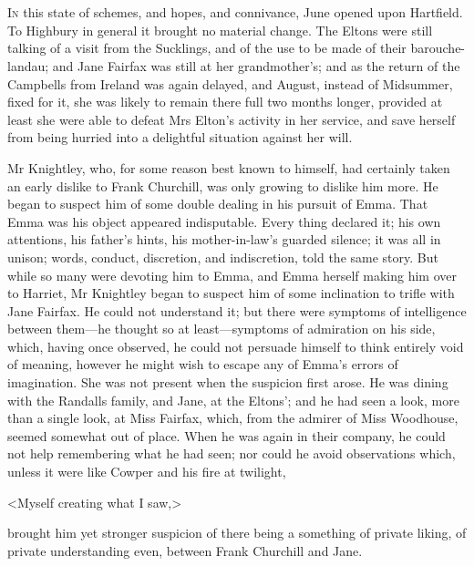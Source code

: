 \chapter[Chapter \thechapter]{}
\lettrine[lraise=0.3]{I}{n} this state of schemes, and hopes, and connivance, June opened upon Hartfield. To Highbury in general it brought no material change. The Eltons were still talking of a visit from the Sucklings, and of the use to be made of their barouche-landau; and Jane Fairfax was still at her grandmother's; and as the return of the Campbells from Ireland was again delayed, and August, instead of Midsummer, fixed for it, she was likely to remain there full two months longer, provided at least she were able to defeat Mrs Elton's activity in her service, and save herself from being hurried into a delightful situation against her will.

Mr Knightley, who, for some reason best known to himself, had certainly taken an early dislike to Frank Churchill, was only growing to dislike him more. He began to suspect him of some double dealing in his pursuit of Emma. That Emma was his object appeared indisputable. Every thing declared it; his own attentions, his father's hints, his mother-in-law's guarded silence; it was all in unison; words, conduct, discretion, and indiscretion, told the same story. But while so many were devoting him to Emma, and Emma herself making him over to Harriet, Mr Knightley began to suspect him of some inclination to trifle with Jane Fairfax. He could not understand it; but there were symptoms of intelligence between them—he thought so at least—symptoms of admiration on his side, which, having once observed, he could not persuade himself to think entirely void of meaning, however he might wish to escape any of Emma's errors of imagination. She was not present when the suspicion first arose. He was dining with the Randalls family, and Jane, at the Eltons'; and he had seen a look, more than a single look, at Miss Fairfax, which, from the admirer of Miss Woodhouse, seemed somewhat out of place. When he was again in their company, he could not help remembering what he had seen; nor could he avoid observations which, unless it were like Cowper and his fire at twilight,

<Myself creating what I saw,>

brought him yet stronger suspicion of there being a something of private liking, of private understanding even, between Frank Churchill and Jane.

